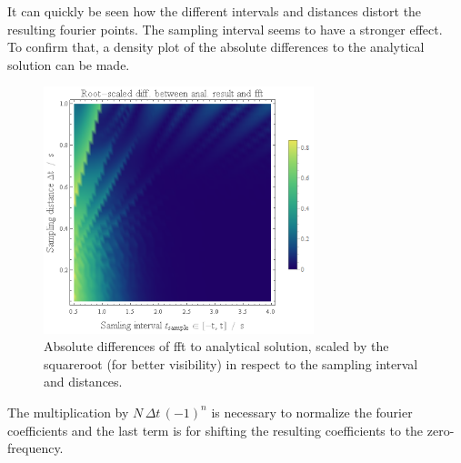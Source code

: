 \documentclass[12pt,a4paper]{article}
\begin{document}
		\noindent It can quickly be seen how the different intervals and distances distort the resulting
		fourier points. The sampling interval seems to have a stronger effect.\\
		To confirm that, a density plot of the absolute differences to the analytical solution
		can be made.
		\begin{figure}[H]
			\centering
			\includegraphics[width=0.7\textwidth]{A2/data/DT_TSampling_Contour.png}
			\caption[]{Absolute differences of fft to analytical solution, scaled
			by the squareroot (for better visibility) in respect to the sampling
			interval and distances.}
		\end{figure}
		\noindent The multiplication by \(N\,\Delta t\, (-1)^n\) is necessary to
		normalize the fourier coefficients and the last term is for shifting the resulting
		coefficients to the zero-frequency.
		\newpage
	
\end{document}
